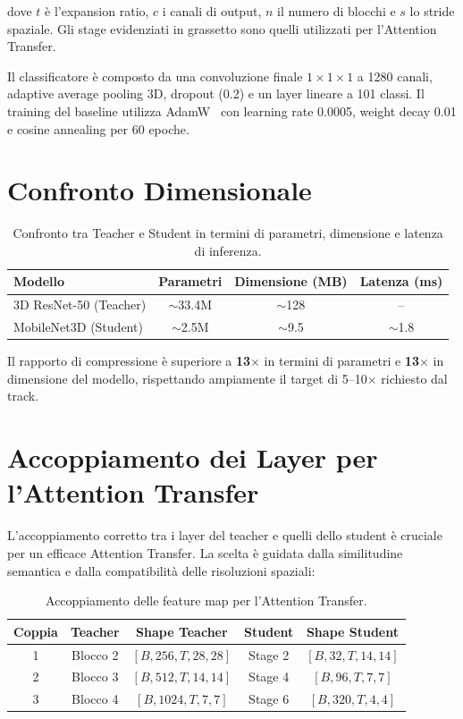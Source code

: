 dove $t$ è l'expansion ratio, $c$ i canali di output, $n$ il numero di blocchi e $s$ lo stride spaziale. Gli stage evidenziati in grassetto sono quelli utilizzati per l'Attention Transfer.

Il classificatore è composto da una convoluzione finale $1\times1\times1$ a 1280 canali, adaptive average pooling 3D, dropout (0.2) e un layer lineare a 101 classi. Il training del baseline utilizza AdamW~\cite{loshchilov2019adamw} con learning rate 0.0005, weight decay 0.01 e cosine annealing per 60 epoche.

\section{Confronto Dimensionale}

\begin{table}[H]
\centering
\caption{Confronto tra Teacher e Student in termini di parametri, dimensione e latenza di inferenza.}
\label{tab:model_comparison}
\begin{tabular}{lccc}
\toprule
\textbf{Modello} & \textbf{Parametri} & \textbf{Dimensione (MB)} & \textbf{Latenza (ms)} \\
\midrule
3D ResNet-50 (Teacher) & $\sim$33.4M & $\sim$128 & -- \\
MobileNet3D (Student)  & $\sim$2.5M  & $\sim$9.5 & $\sim$1.8 \\
\bottomrule
\end{tabular}
\end{table}

Il rapporto di compressione è superiore a \textbf{13$\times$} in termini di parametri e \textbf{13$\times$} in dimensione del modello, rispettando ampiamente il target di 5--10$\times$ richiesto dal track.

\section{Accoppiamento dei Layer per l'Attention Transfer}
\label{sec:layer_pairing}

L'accoppiamento corretto tra i layer del teacher e quelli dello student è cruciale per un efficace Attention Transfer. La scelta è guidata dalla similitudine semantica e dalla compatibilità delle risoluzioni spaziali:

\begin{table}[H]
\centering
\caption{Accoppiamento delle feature map per l'Attention Transfer.}
\label{tab:feature_pairing}
\begin{tabular}{ccccc}
\toprule
\textbf{Coppia} & \textbf{Teacher} & \textbf{Shape Teacher} & \textbf{Student} & \textbf{Shape Student} \\
\midrule
1 & Blocco 2 & $[B, 256, T, 28, 28]$ & Stage 2 & $[B, 32, T, 14, 14]$ \\
2 & Blocco 3 & $[B, 512, T, 14, 14]$ & Stage 4 & $[B, 96, T, 7, 7]$  \\
3 & Blocco 4 & $[B, 1024, T, 7, 7]$ & Stage 6 & $[B, 320, T, 4, 4]$ \\
\bottomrule
\end{tabular}
\end{table}


